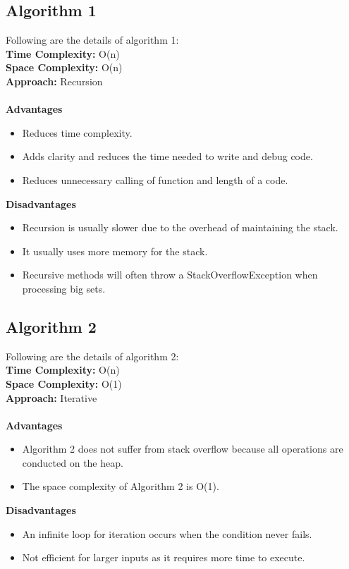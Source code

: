 \documentclass[12pt]{article}
\begin{document}
    \subsection{Algorithm 1}
    Following are the details of algorithm 1: \\
    \textbf{Time Complexity:} O(n) \\
    \textbf{Space Complexity:} O(n) \\
    \textbf{Approach:} Recursion \\ \\
    \textbf{Advantages}
    \begin{itemize}
        \item Reduces time complexity.
        \item Adds clarity and reduces the time needed to write and debug code.
        \item Reduces unnecessary calling of function and length of a code.
    \end{itemize}
    \textbf{Disadvantages}
    \begin{itemize}
        \item Recursion is usually slower due to the overhead of maintaining the stack.
        \item It usually uses more memory for the stack.
        \item Recursive methods will often throw a StackOverflowException when processing big sets.
    \end{itemize}

    \subsection{Algorithm 2}
    Following are the details of algorithm 2: \\
    \textbf{Time Complexity:} O(n) \\
    \textbf{Space Complexity:} O(1) \\
    \textbf{Approach:} Iterative \\ \\
    \textbf{Advantages}
    \begin{itemize}
        \item Algorithm 2 does not suffer from stack overflow because all operations are conducted on the heap.
        \item The space complexity of Algorithm 2 is O(1).
    \end{itemize}
    \textbf{Disadvantages}
    \begin{itemize}
        \item An infinite loop for iteration occurs when the condition never fails.
        \item Not efficient for larger inputs as it requires more time to execute.
    \end{itemize}
\end{document}
